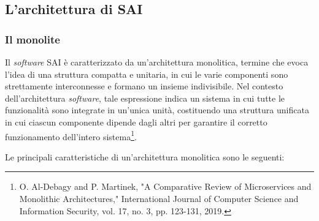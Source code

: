        \subsection{L'architettura di SAI}
        
            \subsubsection{Il monolite}
            
            Il \textit{software} SAI è caratterizzato da un’architettura monolitica, termine che evoca l’idea di una struttura compatta e unitaria, in cui le varie componenti sono strettamente interconnesse e formano un insieme indivisibile. Nel contesto dell'architettura \textit{software}, tale espressione indica un sistema in cui tutte le funzionalità sono integrate in un’unica unità, costituendo una struttura unificata in cui ciascun componente dipende dagli altri per garantire il corretto funzionamento dell’intero sistema\footnote{O. Al-Debagy and P. Martinek, "A Comparative Review of Microservices and Monolithic Architectures," International Journal of Computer Science and Information Security, vol. 17, no. 3, pp. 123-131, 2019.}.  

            \vspace{0.2 em}
            \noindent Le principali caratteristiche di un’architettura monolitica sono le seguenti:  

